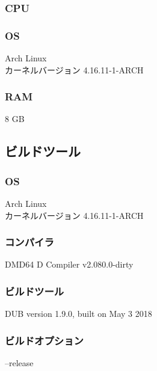 \documentclass[dvipdfmx]{jsarticle}
\begin{document}
			\subsubsection{CPU}
			\subsubsection{OS}
				Arch Linux \\
				カーネルバージョン 4.16.11-1-ARCH
			\subsubsection{RAM}
				8 GB
		\subsection{ビルドツール}
			\subsubsection{OS}
				Arch Linux \\
				カーネルバージョン 4.16.11-1-ARCH
			\subsubsection{コンパイラ}
				DMD64 D Compiler v2.080.0-dirty
			\subsubsection{ビルドツール}
				DUB version 1.9.0, built on May  3 2018
			\subsubsection{ビルドオプション}
				--release
\end{document}
